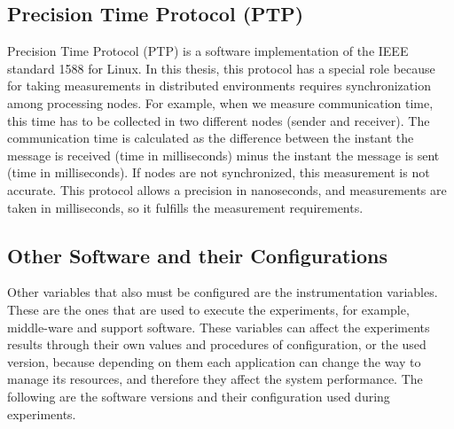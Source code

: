 \subsection{Precision Time Protocol (PTP)}
Precision Time Protocol (PTP) is a software implementation of the IEEE standard 1588 for Linux. In this thesis, this protocol has a special role because for taking measurements in distributed environments requires synchronization among processing nodes. For example, when we measure communication time, this time has to be collected in two different nodes (sender and receiver). The communication time is calculated as the difference between the instant the message is received (time in milliseconds) minus the instant the message is sent (time in milliseconds). If nodes are not synchronized, this measurement is not accurate. This protocol allows a precision in nanoseconds, and measurements are taken in milliseconds, so it fulfills the measurement requirements. 


\subsection{Other Software and their Configurations}
Other variables that also must be configured are the instrumentation variables. These are the ones that are used to execute the experiments, for example,  middle-ware and support software. These variables can affect the experiments results through their own values and procedures of configuration, or the used version, because depending on them each application can change the way to manage its resources, and therefore they affect the system performance. The following are the software versions and their configuration used during experiments.

